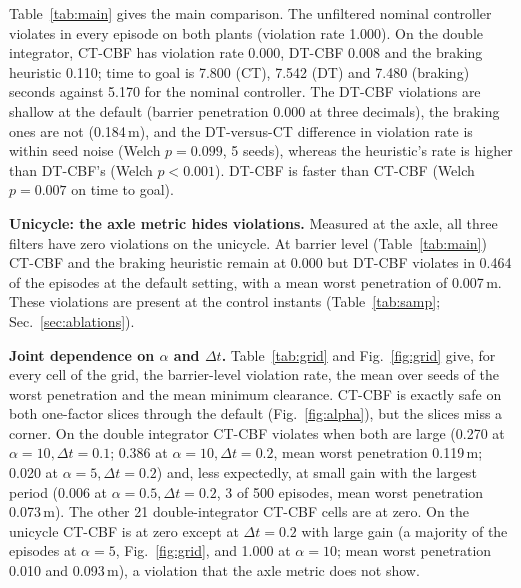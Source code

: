 \begin{table}[t]\centering\caption{Main results at $\alpha=2$, $\Delta t=0.05$\,s, $d_{th}=1$\,m (mean $\pm$ std over 5 seeds; all systems reimplemented; Nominal is the unfiltered controller, DT-CBF the method row). ``violation\_rate'' and ``min\_clearance'' are axle-level, ``barrier\_*'' are measured on the controlled point (identical on the double integrator; Sec.~\ref{sec:setup}); ``barrier\_penetration'' is the deepest violation among a seed's 100 episodes.}\label{tab:main}
\setlength{\tabcolsep}{4pt}\resizebox{\textwidth}{!}{}\end{table}

Table~\ref{tab:main} gives the main comparison. The unfiltered nominal controller violates in every episode on both plants (violation rate 1.000). On the double integrator, CT-CBF has violation rate 0.000, DT-CBF 0.008 and the braking heuristic 0.110; time to goal is 7.800 (CT), 7.542 (DT) and 7.480 (braking) seconds against 5.170 for the nominal controller. The DT-CBF violations are shallow at the default (barrier penetration 0.000 at three decimals), the braking ones are not (0.184\,m), and the DT-versus-CT difference in violation rate is within seed noise (Welch $p=0.099$, 5 seeds), whereas the heuristic's rate is higher than DT-CBF's (Welch $p<0.001$). DT-CBF is faster than CT-CBF (Welch $p=0.007$ on time to goal).

\textbf{Unicycle: the axle metric hides violations.} Measured at the axle, all three filters have zero violations on the unicycle. At barrier level (Table~\ref{tab:main}) CT-CBF and the braking heuristic remain at 0.000 but DT-CBF violates in 0.464 of the episodes at the default setting, with a mean worst penetration of 0.007\,m. These violations are present at the control instants (Table~\ref{tab:samp}; Sec.~\ref{sec:ablations}).

\textbf{Joint dependence on $\alpha$ and $\Delta t$.} Table~\ref{tab:grid} and Fig.~\ref{fig:grid} give, for every cell of the grid, the barrier-level violation rate, the mean over seeds of the worst penetration and the mean minimum clearance. CT-CBF is exactly safe on both one-factor slices through the default (Fig.~\ref{fig:alpha}), but the slices miss a corner. On the double integrator CT-CBF violates when both are large (0.270 at $\alpha=10,\Delta t=0.1$; 0.386 at $\alpha=10,\Delta t=0.2$, mean worst penetration 0.119\,m; 0.020 at $\alpha=5,\Delta t=0.2$) and, less expectedly, at small gain with the largest period (0.006 at $\alpha=0.5,\Delta t=0.2$, 3 of 500 episodes, mean worst penetration 0.073\,m). The other 21 double-integrator CT-CBF cells are at zero. On the unicycle CT-CBF is at zero except at $\Delta t=0.2$ with large gain (a majority of the episodes at $\alpha=5$, Fig.~\ref{fig:grid}, and 1.000 at $\alpha=10$; mean worst penetration 0.010 and 0.093\,m), a violation that the axle metric does not show.


